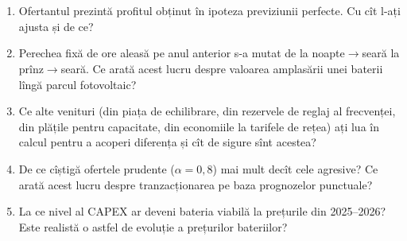 \section{}
\begin{enumerate}
\item {}%
{Ofertantul prezintă profitul obținut în ipoteza previziunii perfecte. Cu cît l-ați ajusta și de ce?}
\item {}%
{Perechea fixă de ore aleasă pe anul anterior s-a mutat de la noapte$\rightarrow$seară la prînz$\rightarrow$seară. Ce arată acest lucru despre valoarea amplasării unei baterii lîngă parcul fotovoltaic?}
\item {}%
{Ce alte venituri (din piața de echilibrare, din rezervele de reglaj al frecvenței, din plățile pentru capacitate, din economiile la tarifele de rețea) ați lua în calcul pentru a acoperi diferența și cît de sigure sînt acestea?}
\item {}%
{De ce cîștigă ofertele prudente ($\alpha=0{,}8$) mai mult decît cele agresive? Ce arată acest lucru despre tranzacționarea pe baza prognozelor punctuale?}
\item {}%
{La ce nivel al CAPEX ar deveni bateria viabilă la prețurile din 2025--2026? Este realistă o astfel de evoluție a prețurilor bateriilor?}
\end{enumerate}

